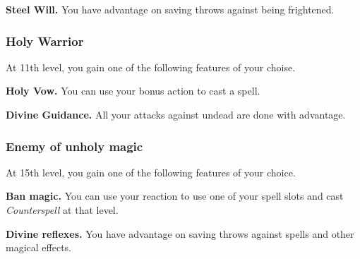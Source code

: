 \textbf{Steel Will.} You have advantage on saving throws against being frightened.

\subsubsection*{Holy Warrior}
At 11th level, you gain one of the following features of your choise.

\textbf{Holy Vow.} You can use your bonus action to cast a spell.

\textbf{Divine Guidance.} All your attacks against undead are done with advantage.

\subsubsection*{Enemy of unholy magic}
At 15th level, you gain one of the following features of your choice.

\textbf{Ban magic.} You can use your reaction to use one of your spell slots and cast \textit{Counterspell} at that level.

\textbf{Divine reflexes.} You have advantage on saving throws against spells and other magical effects.